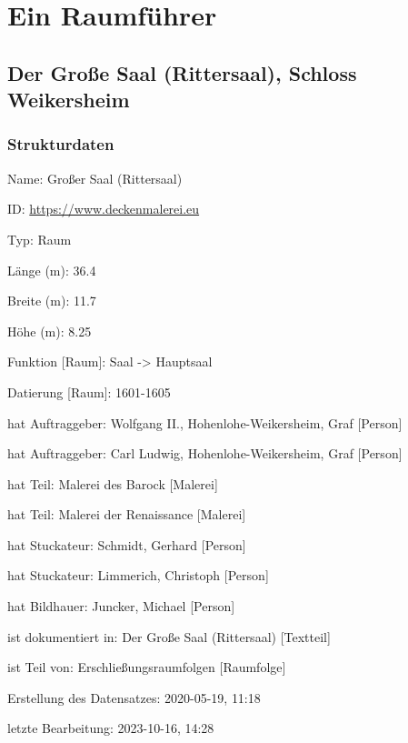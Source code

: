 \documentclass[
  a4paper,
  openany]{book}
\begin{document}
\tableofcontents
{\let\newpage\relax}

\RaggedRight

\mainmatter
{}

\chapter{Ein Raumführer}\label{ein-raumfuxfchrer}

\section{Der Große Saal (Rittersaal), Schloss
Weikersheim}\label{der-grouxdfe-saal-rittersaal-schloss-weikersheim}

\subsection{Strukturdaten}\label{strukturdaten}

Name: Großer Saal (Rittersaal)

ID:
\href{https://www.deckenmalerei.eu/15685f4a-3727-4110-8967-1d8287431997}{https://www.deckenmalerei.eu}

Typ: Raum

Länge (m): 36.4

Breite (m): 11.7

Höhe (m): 8.25

Funktion {[}Raum{]}: Saal -\textgreater{} Hauptsaal

Datierung {[}Raum{]}: 1601-1605

hat Auftraggeber: Wolfgang II., Hohenlohe-Weikersheim, Graf {[}Person{]}

hat Auftraggeber: Carl Ludwig, Hohenlohe-Weikersheim, Graf {[}Person{]}

hat Teil: Malerei des Barock {[}Malerei{]}

hat Teil: Malerei der Renaissance {[}Malerei{]}

hat Stuckateur: Schmidt, Gerhard {[}Person{]}

hat Stuckateur: Limmerich, Christoph {[}Person{]}

hat Bildhauer: Juncker, Michael {[}Person{]}

ist dokumentiert in: Der Große Saal (Rittersaal) {[}Textteil{]}

ist Teil von: Erschließungsraumfolgen {[}Raumfolge{]}

Erstellung des Datensatzes: 2020-05-19, 11:18

letzte Bearbeitung: 2023-10-16, 14:28
\end{document}
